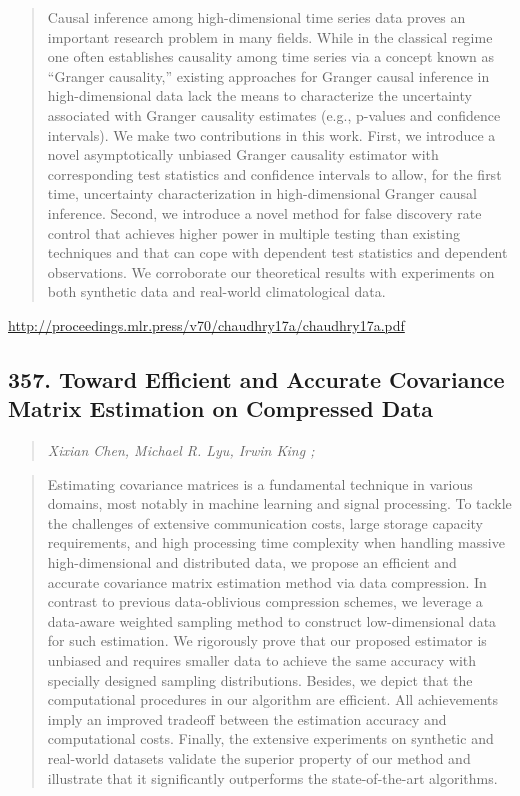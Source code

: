 \documentclass{article}
\begin{document}
\begin{quote}
    Causal inference among high-dimensional time series data proves an important research problem in many fields. While in the classical regime one often establishes causality among time series via a concept known as “Granger causality,” existing approaches for Granger causal inference in high-dimensional data lack the means to characterize the uncertainty associated with Granger causality estimates (e.g., p-values and confidence intervals). We make two contributions in this work. First, we introduce a novel asymptotically unbiased Granger causality estimator with corresponding test statistics and confidence intervals to allow, for the first time, uncertainty characterization in high-dimensional Granger causal inference. Second, we introduce a novel method for false discovery rate control that achieves higher power in multiple testing than existing techniques and that can cope with dependent test statistics and dependent observations. We corroborate our theoretical results with experiments on both synthetic data and real-world climatological data.  \end{quote}

\href{http://proceedings.mlr.press/v70/chaudhry17a/chaudhry17a.pdf}{http://proceedings.mlr.press/v70/chaudhry17a/chaudhry17a.pdf}

\subsection{357. Toward Efficient and Accurate Covariance Matrix Estimation on Compressed Data}

\begin{quote}
\footnotesize{\textit{Xixian Chen, Michael R. Lyu, Irwin King ;}}
\end{quote}

\begin{quote}
    Estimating covariance matrices is a fundamental technique in various domains, most notably in machine learning and signal processing. To tackle the challenges of extensive communication costs, large storage capacity requirements, and high processing time complexity when handling massive high-dimensional and distributed data, we propose an efficient and accurate covariance matrix estimation method via data compression. In contrast to previous data-oblivious compression schemes, we leverage a data-aware weighted sampling method to construct low-dimensional data for such estimation. We rigorously prove that our proposed estimator is unbiased and requires smaller data to achieve the same accuracy with specially designed sampling distributions. Besides, we depict that the computational procedures in our algorithm are efficient. All achievements imply an improved tradeoff between the estimation accuracy and computational costs. Finally, the extensive experiments on synthetic and real-world datasets validate the superior property of our method and illustrate that it significantly outperforms the state-of-the-art algorithms.  \end{quote}
\end{document}
